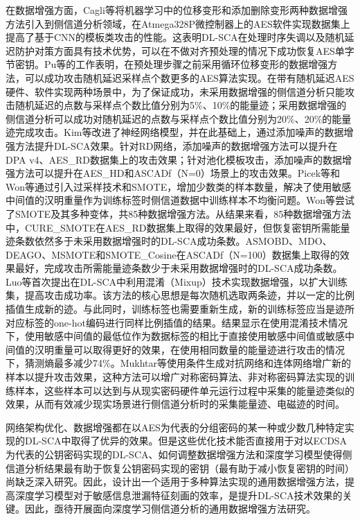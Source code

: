 {	在数据增强方面，Cagli等\citep{Cagli17}将机器学习中的位移变形和添加删除变形两种数据增强方法引入到侧信道分析领域，在Atmega328P微控制器上的AES软件实现数据集上提高了基于CNN的模板类攻击的性能。这表明DL-SCA在处理时序失调以及随机延迟防护对策方面具有技术优势，可以在不做对齐预处理的情况下成功恢复AES单字节密钥。Pu等\citep{Pu17}的工作表明，在预处理步骤之前采用循环位移变形的数据增强方法，可以成功攻击随机延迟采样点个数更多的AES算法实现。在带有随机延迟AES硬件、软件实现两种场景中，为了保证成功，未采用数据增强的侧信道分析只能攻击随机延迟的点数与采样点个数比值分别为5\%、10\%的能量迹；采用数据增强的侧信道分析可以成功对随机延迟的点数与采样点个数比值分别为20\%、20\%的能量迹完成攻击。Kim等\citep{Kim19}改进了神经网络模型，并在此基础上，通过添加噪声的数据增强方法提升DL-SCA效果。针对RD网络，添加噪声的数据增强方法可以提升在DPA v4、AES\_RD数据集上的攻击效果；针对池化模板攻击，添加噪声的数据增强方法可以提升在AES\_HD和ASCADf（N=0）场景上的攻击效果。Picek等\citep{Picek19}和Won等\citep{Won20}通过引入过采样技术和SMOTE，增加少数类的样本数量，解决了使用敏感中间值的汉明重量作为训练标签时侧信道数据中训练样本不均衡问题。Won等\citep{Won20}尝试了SMOTE及其多种变体，共85种数据增强方法\citep{Kovcs19}。从结果来看，85种数据增强方法中，CURE\_SMOTE在AES\_RD数据集上取得的效果最好，但恢复密钥所需能量迹条数依然多于未采用数据增强时的DL-SCA成功条数。ASMOBD、MDO、DEAGO、MSMOTE和SMOTE\_Cosine在ASCADf（N=100）数据集上取得的效果最好，完成攻击所需能量迹条数少于未采用数据增强时的DL-SCA成功条数。Luo等\citep{Luo21}首次提出在DL-SCA中利用混淆（Mixup）技术实现数据增强，以扩大训练集，提高攻击成功率。该方法的核心思想是每次随机选取两条迹，并以一定的比例插值生成新的迹。与此同时，训练标签也需要重新生成，新的训练标签应当是迹所对应标签的one-hot编码进行同样比例插值的结果。结果显示在使用混淆技术情况下，使用敏感中间值的最低位作为数据标签的相比于直接使用敏感中间值或敏感中间值的汉明重量可以取得更好的效果，在使用相同数量的能量迹进行攻击的情况下，猜测熵最多减少74\%。Mukhtar等\citep{Mukhtar22}使用条件生成对抗网络和连体网络增广新的样本以提升攻击效果，这种方法可以增广对称密码算法、非对称密码算法实现的训练样本，这些样本可以达到与从现实密码硬件单元运行过程中采集的能量迹类似的效果，从而有效减少现实场景进行侧信道分析时的采集能量迹、电磁迹的时间。
	
	网络架构优化、数据增强都在以AES为代表的分组密码的某一种或少数几种特定实现的DL-SCA中取得了优异的效果。但是这些优化技术能否直接用于对以ECDSA为代表的公钥密码实现的DL-SCA、如何调整数据增强方法和深度学习模型使得侧信道分析结果最有助于恢复公钥密码实现的密钥（最有助于减小恢复密钥的时间）尚缺乏深入研究。因此，设计出一个适用于多种算法实现的通用数据增强方法，提高深度学习模型对于敏感信息泄漏特征刻画的效率，是提升DL-SCA技术效果的关键。因此，亟待开展面向深度学习侧信道分析的通用数据增强方法研究。
	
}
